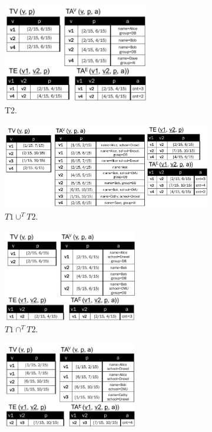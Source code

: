 \begin{figure}
\begin{subfigure}{2.5in}
\includegraphics[width=2.5in]{figs/T2_rel.pdf}
\caption{T2.}
\label{fig:tg_t2}
\end{subfigure}
\begin{subfigure}{4.3in}
\includegraphics[width=4.3in]{figs/T1_union_T2_rel.pdf}
\caption{$T1 \cup^T T2.$}
\label{fig:tg_union}
\end{subfigure}
\begin{subfigure}{2.3in}
\includegraphics[width=2.3in]{figs/T1_inter_T2_rel.pdf}
\caption{$T1 \cap^T T2$.}
\vspace{-0.2cm}
\label{fig:tg_inter}
\end{subfigure}
\begin{subfigure}{2.3in}
\includegraphics[width=2.3in]{figs/T1_diff_T2_rel.pdf}

\end{subfigure}
\end{figure}
